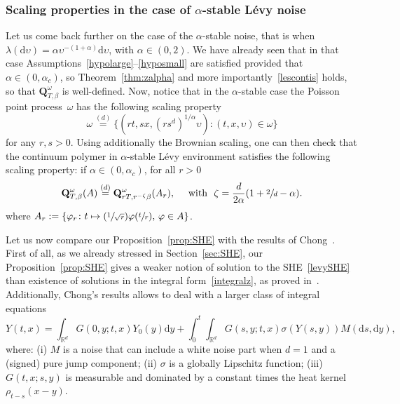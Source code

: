 \documentclass[10pt]{amsart}
\let\sep:
\newcommand{\Psfrac}[2]{(\sfrac{#1}{#2})}
\theoremstyle{definition}
\newcommand{\dd}{\mathrm{d}}
\newcommand{\bQ}{{\ensuremath{\mathbf Q}} }
\newcommand{\bbR}{{\ensuremath{\mathbb R}} }
\let\ga\alpha
\let\gb\beta
\let\ups\upsilon
\let\go\omega
\begin{document}
\subsubsection{Scaling properties in the case of $\ga$-stable Lévy noise}
Let us come back further on the case
of the $\alpha$-stable noise,
that is when $\lambda(\dd \ups) = \ga \ups^{-(1+\ga)} \dd \ups$, with $\ga\in (0,2)$.
We have already seen that in that case Assumptions~\eqref{hypolarge}--\eqref{hyposmall} are satisfied provided that $\ga\in (0,\ga_c)$, so Theorem~\ref{thm:zalpha} and more importantly~\eqref{lescontis} holds, so that $\bQ_{T,\gb}^{\go}$ is well-defined.
Now, notice that in the $\ga$-stable case the Poisson point process~$\go$ has the following scaling property\vspace*{-3pt}
\[
\go \stackrel{(d)}{=} \{ (r t, s x, (rs^d)^{1/\ga} \ups) \sep (t,x,\ups)\in \go \}
\]
for any $r,s>0$.
Using additionally the Brownian scaling,
one can then check that
the continuum polymer in $\alpha$-stable Lévy environment
satisfies the following
scaling property: if $\ga\in (0,\ga_c)$, for all $r>0$
\begin{equation}\label{scaling}
\bQ^{\go }_{T, \beta} (A) \stackrel{(d)}{=} \bQ_{r T, r^{-\zeta}\gb }^{\go} (A_r), \quad \text{ with }\ \zeta=\frac{d}{2\ga} (1 +\sfrac{2}{d} - \ga).
\end{equation}
where $A_r := \{ \varphi_r\colon t\mapsto \Psfrac{1}{\sqrt{r}} \varphi(\sfrac{t}{r}),\, \varphi\in A \}$.

Let us now compare our Proposition~\ref{prop:SHE}
with the results of Chong~\cite{Chong17}.
First of all, as we already stressed in Section~\ref{sec:SHE},
our Proposition~\ref{prop:SHE} gives a weaker
notion of solution to the SHE~\eqref{levySHE}
than existence of solutions in the integral form~\eqref{integralz}, as proved in~\cite{Chong17}.
Additionally,
Chong's results allows to deal with a larger class of integral equations
\begin{equation}
\label{SHEchong}
Y(t,x) = \int_{\bbR^d} G(0,y; t,x)Y_0(y)\dd y + \int_0^t \int_{\bbR^d} G(s,y ; t,x) \sigma(Y(s,y)) M(\dd s,\dd y),
\end{equation}
where: (i) $M$ is a noise that can include a white noise part when $d=1$ and a (signed) pure jump component;
(ii) $\sigma$ is a globally Lipschitz function;
(iii) $G(t,x; s,y)$ is measurable and dominated by a constant times the heat kernel $\rho_{t-s}(x-y)$.
\end{document}
